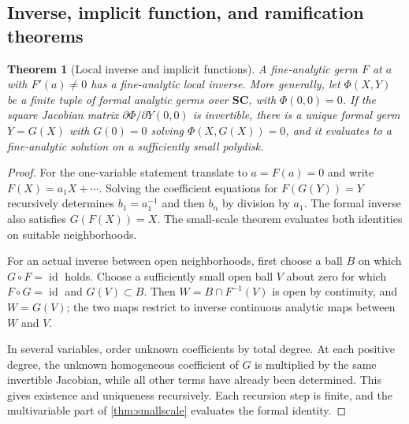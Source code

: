 \documentclass[11pt,letterpaper]{article}
\newtheorem{theorem}{Theorem}[section]
\theoremstyle{definition}
\theoremstyle{remark}
\newcommand{\SC}{\mathbf{SC}}
\newcommand{\id}{\operatorname{id}}
\numberwithin{equation}{section}
\begin{document}
\subsection{Inverse, implicit function, and ramification theorems}
\begin{theorem}[Local inverse and implicit functions]\label{thm:inverse}
A fine-analytic germ $F$ at $a$ with $F'(a)\ne0$ has a fine-analytic local inverse. More generally, let $\Phi(X,Y)$ be a finite tuple of formal analytic germs over $\SC$, with $\Phi(0,0)=0$. If the square Jacobian matrix $\partial\Phi/\partial Y(0,0)$ is invertible, there is a unique formal germ $Y=G(X)$ with $G(0)=0$ solving $\Phi(X,G(X))=0$, and it evaluates to a fine-analytic solution on a sufficiently small polydisk.
\end{theorem}
\begin{proof}
For the one-variable statement translate to $a=F(a)=0$ and write $F(X)=a_1X+\cdots$. Solving the coefficient equations for $F(G(Y))=Y$ recursively determines $b_1=a_1^{-1}$ and then $b_n$ by division by $a_1$. The formal inverse also satisfies $G(F(X))=X$. The small-scale theorem evaluates both identities on suitable neighborhoods.

For an actual inverse between open neighborhoods, first choose a ball $B$ on which $G\circ F=\id$ holds. Choose a sufficiently small open ball $V$ about zero for which $F\circ G=\id$ and $G(V)\subset B$. Then $W=B\cap F^{-1}(V)$ is open by continuity, and $W=G(V)$; the two maps restrict to inverse continuous analytic maps between $W$ and $V$.

In several variables, order unknown coefficients by total degree. At each positive degree, the unknown homogeneous coefficient of $G$ is multiplied by the same invertible Jacobian, while all other terms have already been determined. This gives existence and uniqueness recursively. Each recursion step is finite, and the multivariable part of \cref{thm:smallscale} evaluates the formal identity.
\end{proof}
\end{document}
